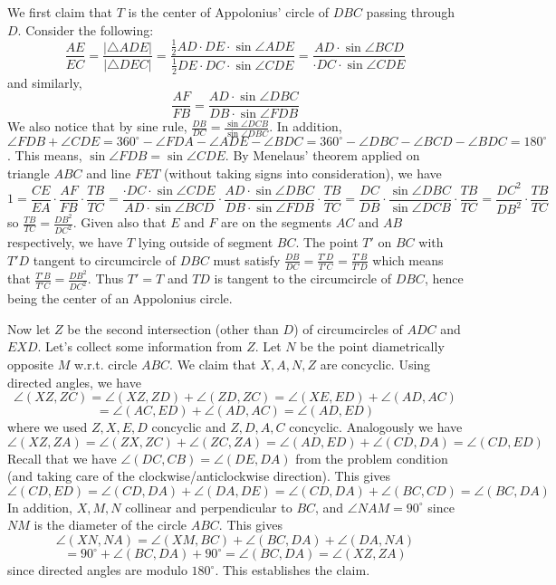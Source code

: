 \documentclass[11pt,a4paper]{article}
\newcommand{\<}{\langle}
\renewcommand{\>}{\rangle}
\begin{document}
\begin{enumerate}
	We first claim that $T$ is the center of Appolonius' circle of $DBC$ passing through $D$. 
	Consider the following: 
	\[
	\frac{AE}{EC}=\frac{|\triangle ADE|}{|\triangle DEC|}=\frac{\frac 12 AD\cdot DE\cdot \sin \angle ADE}{\frac 12 DE\cdot DC\cdot \sin \angle CDE}
	=\frac{AD\cdot \sin \angle BCD}{\cdot DC\cdot \sin \angle CDE}
	\]
	and similarly, 
	\[
	\frac{AF}{FB}=\frac{AD\cdot\sin \angle DBC}{DB\cdot\sin \angle FDB}
	\]
	We also notice that by sine rule, $\frac{DB}{DC}=\frac{\sin\angle DCB}{\sin\angle DBC}$. 
	In addition, $\angle FDB+\angle CDE=360^{\circ}-\angle FDA-\angle ADE-\angle BDC
	=360^{\circ}-\angle DBC-\angle BCD-\angle BDC=180^{\circ}$. 
	This means, $\sin \angle FDB=\sin\angle CDE$. 
	By Menelaus' theorem applied on triangle $ABC$ and line $FET$ (without taking signs into consideration), we have 
	\[
	1=\frac{CE}{EA}\cdot\frac{AF}{FB}\cdot\frac{TB}{TC}
	=\frac{\cdot DC\cdot \sin \angle CDE}{AD\cdot \sin \angle BCD}
	\cdot\frac{AD\cdot\sin \angle DBC}{DB\cdot\sin \angle FDB}
	\cdot\frac{TB}{TC}
	=\frac{DC}{DB}\cdot\frac{\sin \angle DBC}{\sin\angle DCB}\cdot \frac{TB}{TC}
	=\frac{DC^2}{DB^2}\cdot \frac{TB}{TC}
	\]
	so $\frac{TB}{TC}=\frac{DB^2}{DC^2}$. Given also that $E$ and $F$ are on the segments $AC$ and $AB$ respectively, we have $T$ lying outside of segment $BC$. The point $T'$ on $BC$ with $T'D$ tangent to circumcircle of $DBC$ must satisfy $\frac{DB}{DC}=\frac{T'D}{T'C}=\frac{T'B}{T'D}$ which means that $\frac{T'B}{T'C}=\frac{DB^2}{DC^2}$. Thus $T'=T$ and $TD$ is tangent to the circumcircle of $DBC$, hence being the center of an Appolonius circle. 
	
	Now let $Z$ be the second intersection (other than $D$) of circumcircles of $ADC$ and $EXD$. Let's collect some information from $Z$. Let $N$ be the point diametrically opposite $M$ w.r.t. circle $ABC$. We claim that $X, A, N, Z$ are concyclic. Using directed angles, we have 
	\[\angle(XZ, ZC)
	=\angle(XZ, ZD)+\angle(ZD, ZC)
	=\angle(XE, ED)+\angle(AD, AC)
	\]\[
	=\angle(AC, ED)+\angle(AD, AC)
	=\angle(AD, ED)
	\]
	where we used $Z, X, E, D$ concyclic and $Z, D, A, C$ concyclic. 
	Analogously we have 
	\[
	\angle(XZ, ZA)
	=\angle(ZX, ZC)+\angle(ZC, ZA)
	=\angle(AD, ED)+\angle (CD, DA)
	=\angle(CD, ED)
	\]
	Recall that we have $\angle(DC, CB)=\angle(DE, DA)$ from the problem condition (and taking care of the clockwise/anticlockwise direction). 
	This gives 
	\[
	\angle(CD, ED)=\angle(CD, DA)+\angle(DA, DE)=\angle(CD, DA)+\angle(BC, CD)=\angle(BC, DA)
	\]
	In addition, $X, M, N$ collinear and perpendicular to $BC$, and $\angle NAM=90^{\circ}$ since $NM$ is the diameter of the circle $ABC$. This gives 
	\[
	\angle(XN, NA)=\angle(XM, BC)+\angle(BC, DA)+\angle(DA, NA)
	\]\[=90^{\circ}+\angle(BC, DA)+90^{\circ}=\angle(BC, DA)=\angle(XZ, ZA)
	\]
	since directed angles are modulo $180^{\circ}$. This establishes the claim. 
	

\end{enumerate}
\end{document}
